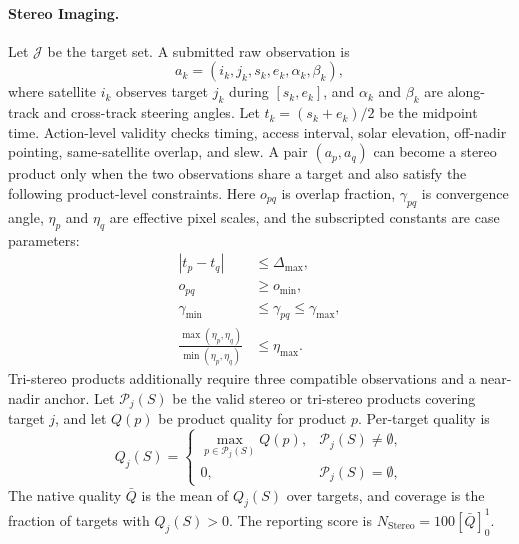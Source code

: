 \documentclass[11pt]{article}
\begin{document}
\paragraph{Stereo Imaging.} Let \(\mathcal{J}\) be the target set. A submitted raw observation is
\[
  a_k=(i_k,j_k,s_k,e_k,\alpha_k,\beta_k),
\]
where satellite \(i_k\) observes target \(j_k\) during \([s_k,e_k]\), and \(\alpha_k\) and \(\beta_k\) are along-track and cross-track steering angles. Let \(t_k=(s_k+e_k)/2\) be the midpoint time. Action-level validity checks timing, access interval, solar elevation, off-nadir pointing, same-satellite overlap, and slew. A pair \((a_p,a_q)\) can become a stereo product only when the two observations share a target and also satisfy the following product-level constraints. Here \(o_{pq}\) is overlap fraction, \(\gamma_{pq}\) is convergence angle, \(\eta_p\) and \(\eta_q\) are effective pixel scales, and the subscripted constants are case parameters:
\[
  \begin{aligned}
  |t_p-t_q|&\le \Delta_{\max},\\
  o_{pq}&\ge o_{\min},\\
  \gamma_{\min}&\le \gamma_{pq}\le \gamma_{\max},\\
  \frac{\max(\eta_p,\eta_q)}{\min(\eta_p,\eta_q)}&\le \eta_{\max}.
  \end{aligned}
\]
Tri-stereo products additionally require three compatible observations and a near-nadir anchor. Let \(\mathcal{P}_j(S)\) be the valid stereo or tri-stereo products covering target \(j\), and let \(Q(p)\) be product quality for product \(p\). Per-target quality is
\[
  Q_j(S)=
  \begin{cases}
    \max_{p\in\mathcal{P}_j(S)} Q(p), & \mathcal{P}_j(S)\ne\emptyset,\\
    0, & \mathcal{P}_j(S)=\emptyset,
  \end{cases}
\]
The native quality \(\bar{Q}\) is the mean of \(Q_j(S)\) over targets, and coverage is the fraction of targets with \(Q_j(S)>0\). The reporting score is \(N_{\mathrm{Stereo}}=100[\bar{Q}]_0^1\).
\end{document}
